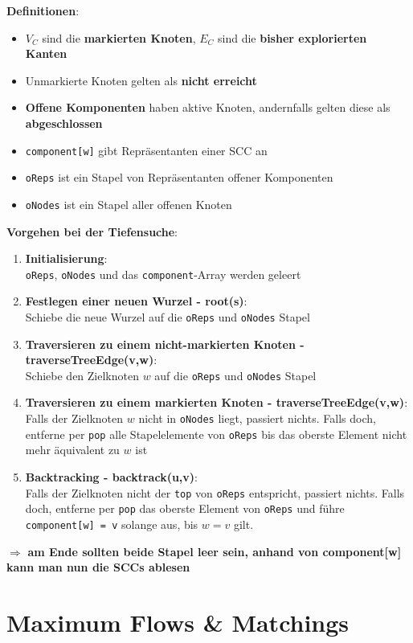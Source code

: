 \documentclass[10pt,a4paper]{article}
\begin{document}
	\textbf{Definitionen}:
	\begin{itemize}
		\item $V_C$ sind die \textbf{markierten Knoten}, $E_C$ sind die \textbf{bisher explorierten Kanten}
		\item Unmarkierte Knoten gelten als \textbf{nicht erreicht}
		\item \textbf{Offene Komponenten} haben aktive Knoten, andernfalls gelten diese als \textbf{abgeschlossen}
		\item \texttt{component[w]} gibt Repräsentanten einer SCC an
		\item \texttt{oReps} ist ein Stapel von Repräsentanten offener Komponenten
		\item \texttt{oNodes} ist ein Stapel aller offenen Knoten
	\end{itemize}
	\textbf{Vorgehen bei der Tiefensuche}:
	\begin{enumerate}
		\item \textbf{Initialisierung}:\\\texttt{oReps}, \texttt{oNodes} und das \texttt{component}-Array werden geleert
		\item \textbf{Festlegen einer neuen Wurzel - root(s)}:\\Schiebe die neue Wurzel auf die \texttt{oReps} und \texttt{oNodes} Stapel
		\item \textbf{Traversieren zu einem nicht-markierten Knoten - traverseTreeEdge(v,w)}:\\Schiebe den Zielknoten $w$ auf die \texttt{oReps} und \texttt{oNodes} Stapel
		\item \textbf{Traversieren zu einem markierten Knoten - traverseTreeEdge(v,w)}:\\Falls der Zielknoten $w$ nicht in \texttt{oNodes} liegt, passiert nichts. Falls doch, entferne per \texttt{pop} alle Stapelelemente von \texttt{oReps} bis das oberste Element nicht mehr äquivalent zu $w$ ist
		\item \textbf{Backtracking - backtrack(u,v)}:\\Falls der Zielknoten nicht der \texttt{top} von \texttt{oReps} entspricht, passiert nichts. Falls doch, entferne per \texttt{pop} das oberste Element von \texttt{oReps} und führe \texttt{component[w] = v} solange aus, bis $w = v$ gilt.
	\end{enumerate}
	$\Rightarrow$ \textbf{am Ende sollten beide Stapel leer sein, anhand von component[w] kann man nun die SCCs ablesen}

	\newpage
	\section{Maximum Flows \& Matchings}
	\label{mfm:sec:maximum_flows_matchings}
	
\end{document}
